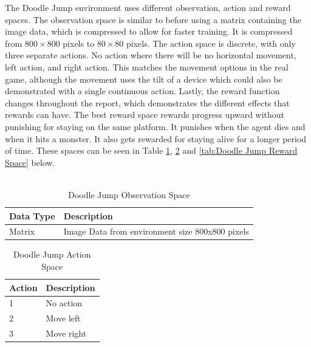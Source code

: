 \documentclass[a4paper,12pt]{article}
\begin{document}
The Doodle Jump environment uses different observation, action and reward spaces. The observation space is similar to before using a matrix containing the image data, which is compressed to allow for faster training. It is compressed from $800\times800$ pixels to $80\times80$ pixels. The action space is discrete, with only three separate actions. No action where there will be no horizontal movement, left action, and right action. This matches the movement options in the real game, although the movement uses the tilt of a device which could also be demonstrated with a single continuous action. Lastly, the reward function changes throughout the report, which demonstrates the different effects that rewards can have. The best reward space rewards progress upward without punishing for staying on the same platform. It punishes when the agent dies and when it hits a monster. It also gets rewarded for staying alive for a longer period of time. These spaces can be seen in Table \ref{tab:Doodle Jump Observation Space}, \ref{tab:Doodle Jump Action Space} and \ref{tab:Doodle Jump Reward Space} below.
\\\\
\begin{table}[H]
\centering
\caption{Doodle Jump Observation Space}
\label{tab:Doodle Jump Observation Space}
\begin{tabular}{|ll|}
\hline
\textbf{Data Type} & \textbf{Description}\\ \hline
Matrix & Image Data from environment size 800x800 pixels\\ \hline
\end{tabular}
\end{table}

\begin{table}[H]
\centering
\caption{Doodle Jump Action Space}
\label{tab:Doodle Jump Action Space}
\begin{tabular}{|ll|}
\hline
\textbf{Action} & \textbf{Description}\\ \hline
1 & No action\\ 
2 & Move left \\ 
3 & Move right \\ \hline
\end{tabular}
\end{table}
\end{document}
